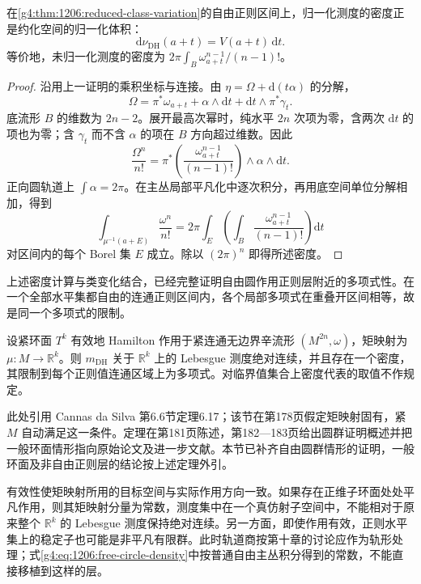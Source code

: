 \begin{proposition}\label{g4:prop:1206:free-circle-density}
	在\cref{g4:thm:1206:reduced-class-variation}的自由正则区间上，归一化测度的密度正是约化空间的归一化体积：
	\begin{equation}\label{g4:eq:1206:free-circle-density}
		\mathrm{d}\nu_{\mathrm{DH}}(a+t)=V(a+t)\,\mathrm{d}t.
	\end{equation}
	等价地，未归一化测度的密度为
	\(2\pi\int_B\omega_{a+t}^{n-1}/(n-1)!\)。
\end{proposition}
\begin{proof}
	沿用上一证明的乘积坐标与连接。由 \(\eta=\Omega+\mathrm{d}(t\alpha)\) 的分解，
	\[
		\Omega
		=\pi^*\omega_{a+t}+\alpha\wedge\mathrm{d}t
		+\mathrm{d}t\wedge\pi^*\gamma_t.
	\]
	底流形 \(B\) 的维数为 \(2n-2\)。展开最高次幂时，纯水平 \(2n\) 次项为零，含两次 \(\mathrm{d}t\) 的项也为零；含 \(\gamma_t\) 而不含 \(\alpha\) 的项在 \(B\) 方向超过维数。因此
	\[
		\frac{\Omega^n}{n!}
		=\pi^*\!\left(\frac{\omega_{a+t}^{n-1}}{(n-1)!}\right)
		\wedge\alpha\wedge\mathrm{d}t.
	\]
	正向圆轨道上 \(\int\alpha=2\pi\)。在主丛局部平凡化中逐次积分，再用底空间单位分解相加，得到
	\[
		\int_{\mu^{-1}(a+E)}\frac{\omega^n}{n!}
		=2\pi\int_E
		\left(\int_B\frac{\omega_{a+t}^{n-1}}{(n-1)!}\right)\mathrm{d}t
	\]
	对区间内的每个 Borel 集 \(E\) 成立。除以 \((2\pi)^n\) 即得所述密度。
\end{proof}

上述密度计算与类变化结合，已经完整证明自由圆作用正则层附近的多项式性。在一个全部水平集都自由的连通正则区间内，各个局部多项式在重叠开区间相等，故是同一个多项式的限制。

\begin{theorem}\label{g4:thm:1206:dh-general}
	设紧环面 \(T^k\) 有效地 Hamilton 作用于紧连通无边界辛流形 \((M^{2n},\omega)\)，矩映射为 \(\mu:M\to\mathbb R^k\)。则 \(m_{\mathrm{DH}}\) 关于 \(\mathbb R^k\) 上的 Lebesgue 测度绝对连续，并且存在一个密度，其限制到每个正则值连通区域上为多项式。对临界值集合上密度代表的取值不作规定。
\end{theorem}

此处引用 Cannas da Silva 第6.6节定理6.17；该节在第178页假定矩映射固有，紧 \(M\) 自动满足这一条件。定理在第181页陈述，第182—183页给出圆群证明概述并把一般环面情形指向原始论文及进一步文献。本节已补齐自由圆群情形的证明，一般环面及非自由正则层的结论按上述定理外引。\cite[第6.6节，定理6.17，第178、181--183页]{Cannas2006Symplectic}

\ProseParagraphBreak

有效性使矩映射所用的目标空间与实际作用方向一致。如果存在正维子环面处处平凡作用，则其矩映射分量为常数，测度集中在一个真仿射子空间中，不能相对于原来整个 \(\mathbb R^k\) 的 Lebesgue 测度保持绝对连续。另一方面，即使作用有效，正则水平集上的稳定子也可能是非平凡有限群。此时轨道商按第十章的讨论应作为轨形处理；式\eqref{g4:eq:1206:free-circle-density}中按普通自由主丛积分得到的常数，不能直接移植到这样的层。


